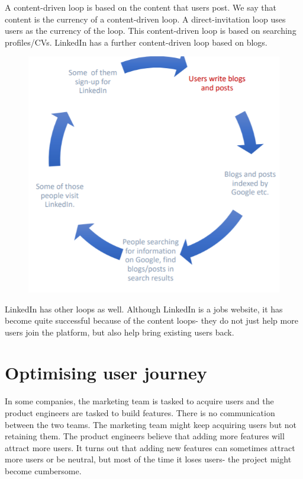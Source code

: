 \documentclass[a4paper, openany]{memoir}
\begin{document}
\noindent A content-driven loop is based on the content that users post. We say that content is the currency of a content-driven loop. A direct-invitation loop uses users as the currency of the loop. This content-driven loop is based on searching profiles/CVs. LinkedIn has a further content-driven loop based on blogs.
\begin{figure}[H]
    \centering
    \includegraphics[scale=0.5]{src/18.5 Linkedin growth loop 3.PNG}
\end{figure}
\noindent LinkedIn has other loops as well. Although LinkedIn is a jobs website, it has become quite successful because of the content loops- they do not just help more users join the platform, but also help bring existing users back.

\section{Optimising user journey}
In some companies, the marketing team is tasked to acquire users and the product engineers are tasked to build features. There is no communication between the two teams. The marketing team might keep acquiring users but not retaining them. The product engineers believe that adding more features will attract more users. It turns out that adding new features can sometimes attract more users or be neutral, but most of the time it loses users- the project might become cumbersome.
\end{document}

